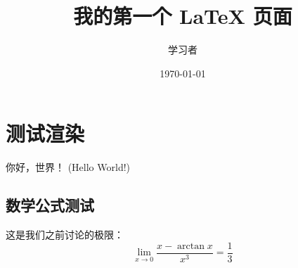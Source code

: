 \documentclass[UTF8]{ctexart} %
\title{我的第一个 \LaTeX{} 页面}
\author{学习者}
\date{\today}
\begin{document}
\maketitle

\section{测试渲染}
你好，世界！ (Hello World!)

\subsection{数学公式测试}
这是我们之前讨论的极限：
\begin{equation}
\lim_{x \to 0} \frac{x - \arctan x}{x^3} = \frac{1}{3}
\end{equation}
\end{document}
